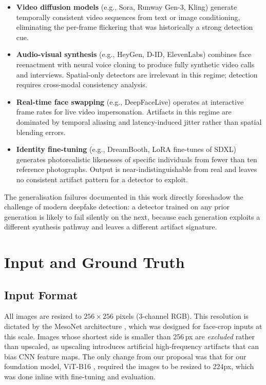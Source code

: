 \documentclass[conference]{IEEEtran}
\begin{document}
\begin{itemize}
  \item \textbf{Video diffusion models} (e.g., Sora, Runway Gen-3, Kling) generate temporally consistent video sequences from text or image conditioning, eliminating the per-frame flickering that was historically a strong detection cue.

  \item \textbf{Audio-visual synthesis} (e.g., HeyGen, D-ID, ElevenLabs) combines face reenactment with neural voice cloning to produce fully synthetic video calls and interviews. Spatial-only detectors are irrelevant in this regime; detection requires cross-modal consistency analysis.

  \item \textbf{Real-time face swapping} (e.g., DeepFaceLive) operates at interactive frame rates for live video impersonation. Artifacts in this regime are dominated by temporal aliasing and latency-induced jitter rather than spatial blending errors.

  \item \textbf{Identity fine-tuning} (e.g., DreamBooth, LoRA fine-tunes of SDXL) generates photorealistic likenesses of specific individuals from fewer than ten reference photographs. Output is near-indistinguishable from real and leaves no consistent artifact pattern for a detector to exploit.
\end{itemize}

The generalisation failures documented in this work directly foreshadow the challenge of modern deepfake detection: a detector trained on any prior generation is likely to fail silently on the next, because each generation exploits a different synthesis pathway and leaves a different artifact signature.

\section{Input and Ground Truth}
\label{sec:input}

\subsection{Input Format}
All images are resized to $256 \times 256$ pixels (3-channel RGB).
This resolution is dictated by the MesoNet architecture \cite{afchar2018mesonet},
which was designed for face-crop inputs at this scale.  Images whose
shortest side is smaller than 256\,px are \emph{excluded} rather than
upscaled, as upscaling introduces artificial high-frequency artifacts
that can bias CNN feature maps. The only change from our proposal was that for our foundation model, ViT-B16 \cite{dosovitskiy2020vit}, required the images to be resized to 224px, which was done inline with fine-tuning and evaluation.
\end{document}
